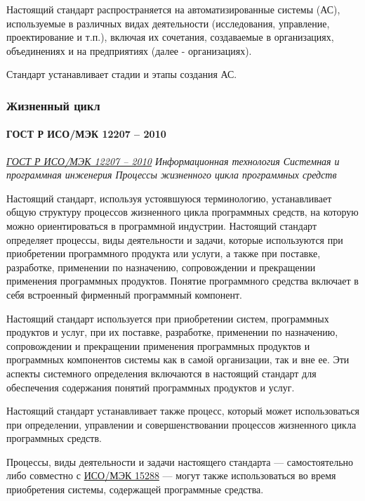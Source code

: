 Настоящий стандарт распространяется на автоматизированные системы (АС),
используемые в различных видах деятельности
(исследования, управление, проектирование и т.п.),
включая их сочетания, создаваемые в организациях,
объединениях и на предприятиях (далее - организациях).

Стандарт устанавливает стадии и этапы создания АС.

\subsubsection{Жизненный цикл}

\paragraph{ГОСТ Р ИСО/МЭК 12207 -- 2010}

\emph{\href{https://docs.cntd.ru/document/1200082859}
{ГОСТ Р ИСО/МЭК 12207 -- 2010}
Информационная технология
Системная и программная инженерия
Процессы жизненного цикла программных средств
}

Настоящий стандарт, используя устоявшуюся терминологию,
устанавливает общую структуру процессов жизненного цикла программных средств,
на которую можно ориентироваться в программной индустрии.
Настоящий стандарт определяет процессы, виды деятельности и задачи,
которые используются при приобретении программного продукта или услуги,
а также при поставке, разработке, применении по назначению,
сопровождении и прекращении применения программных продуктов.
Понятие программного средства включает
в себя встроенный фирменный программный компонент.

Настоящий стандарт используется при приобретении систем,
программных продуктов и услуг, при их поставке, разработке,
применении по назначению, сопровождении
и прекращении применения программных продуктов
и программных компонентов системы как в самой организации, так и вне ее.
Эти аспекты системного определения включаются в настоящий стандарт
для обеспечения содержания понятий программных продуктов и услуг.

Настоящий стандарт устанавливает также процесс,
который может использоваться при определении, управлении
и совершенствовании процессов жизненного цикла программных средств.

Процессы, виды деятельности и задачи настоящего стандарта
--- самостоятельно либо совместно с
\href{https://docs.cntd.ru/document/1200045267}{ИСО/МЭК 15288}
--- могут также использоваться во время приобретения системы,
содержащей программные средства.


